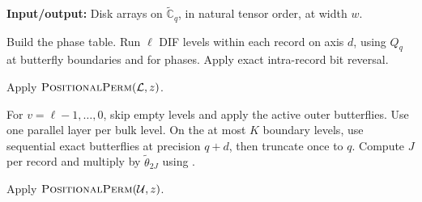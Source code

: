 \documentclass[11pt]{article}
\theoremstyle{definition}
\renewcommand{\label}[1]{}%
\newcommand{\Cg}{\widetilde{\mathbb{C}}}
\newcommand{\TensorFFT}{\textnormal{\textsc{TensorFFT}}}
\newcommand{\PositionalPerm}{\textnormal{\textsc{PositionalPerm}}}
\begin{document}
\begin{algorithm}[tb]
\caption{Direct complex tensor transform $\TensorFFT(z)$}\label{alg:tensor-fft}
\small
\textbf{Input/output:} Disk arrays on $\Cg_q$, in natural tensor order, at width $w$.
\begin{algsteps}[itemsep=1pt,topsep=2pt]
\item Build the phase table. Run $\ell$ DIF levels within each record on axis $d$,
using $Q_q$ at butterfly boundaries and  for phases.
Apply exact intra-record bit reversal.
\item Apply $\PositionalPerm(\mathcal L,z)$.
\item For $v=\ell-1,\ldots,0$, skip empty levels and apply the active outer
butterflies. Use one parallel layer per bulk level. On the at most $K$ boundary
levels, use sequential exact butterflies at precision $q+d$, then truncate
once to $q$. Compute $J$ per record and multiply by $\tilde\theta_{2J}$
using .
\item Apply $\PositionalPerm(\mathcal U,z)$.
\end{algsteps}
\end{algorithm}
\end{document}
